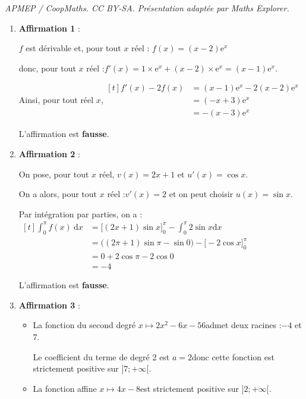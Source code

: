 \documentclass[10pt]{article}
\providecommand{\e}{{\mathrm{e}}}
\renewcommand{\d}{{\mathrm{d}}}
\begin{document}
\noindent\textit{APMEP / CoopMaths. CC BY-SA. Présentation adaptée par Maths Explorer.}\par\medskip
\begin{enumerate}
		\item \textbf{Affirmation 1} :

		$f$ est dérivable  et, pour tout $x$ réel : \quad $f(x) = (x - 2)\e^x$

		donc, pour tout $x$ réel :\quad $f'(x)=1\times \e^x + (x-2)\times \e^x = ( x-1)\e^x$.

		Ainsi, pour tout réel $x$,\quad $\begin{aligned}[t]
		f'(x)-2f(x) & =(x-1)\e^x-2(x-2)\e^x \\
		& =(-x+3)\e^x \\
		& = -(x-3)\e^x
		\end{aligned}$

		L'affirmation est \textbf{fausse}.

		\item \textbf{Affirmation 2} :

		On pose, pour tout $x$ réel, \quad $v(x)=2x+1$ \quad et \quad $u'(x)=\cos x$.

		On a alors, pour tout $x$ réel :\quad $v'(x)=2$ \quad  et on peut choisir \quad $u(x)=\sin x$.

		Par intégration par parties, on a :\quad
		$\begin{aligned}[t]
		\displaystyle\int_0^{\pi} f(x)\:\text{d}x &= \bigg[ (2x+1) \sin x \bigg]_0^{\pi} - \displaystyle \int_0^{\pi} 2 \sin x \d x\\
		&= \bigg( (2 \pi +1) \sin \pi - \sin 0 \bigg) - \bigg[-2 \cos x \bigg]_0^{\pi} \\
		&= 0 + 2 \cos \pi -2 \cos 0 \\
		&= -4
		\end{aligned}$

		L'affirmation est \textbf{fausse}.

		\item \textbf{Affirmation 3} :

		\begin{itemize}
			\item La fonction du second degré \quad $x \longmapsto 2x^2-6x-56$\quad admet deux racines :\quad $-4$ et 7.

			Le coefficient du terme de degré 2 est \quad $a=2$\quad  donc cette fonction est strictement positive sur $]7 ; +\infty[$.

			\item La fonction affine \quad $x \longmapsto 4x-8$\quad  est strictement positive sur $]2 ;+\infty[$.
		\end{itemize}


\end{enumerate}
\end{document}
